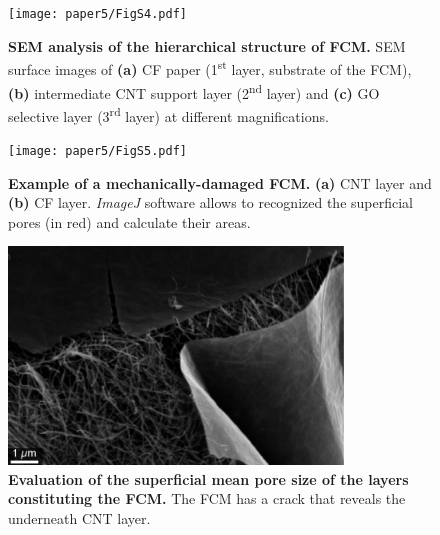 \begin{figure}
  \centering
  \texttt{[image: paper5/FigS4.pdf]}
  \caption{\textbf{SEM analysis of the hierarchical structure of FCM.} SEM surface images of \textbf{(a)} CF paper (1\textsuperscript{st} layer, substrate of the FCM), \textbf{(b)} intermediate CNT support layer (2\textsuperscript{nd} layer) and \textbf{(c)} GO selective layer (3\textsuperscript{rd} layer) at different magnifications.}
  \label{figS4_AppD}
\end{figure}

\begin{figure}
  \centering
  \texttt{[image: paper5/FigS5.pdf]}
  \caption{\textbf{Example of a mechanically-damaged FCM.} \textbf{(a)} CNT layer and \textbf{(b)} CF layer. \textit{ImageJ} software allows to recognized the superficial pores (in red) and calculate their areas.}
  \label{figS5_AppD}
\end{figure}



\begin{figure}
  \centering
  \includegraphics[width=3.5in]{paper5/FigS6.pdf}
  \caption{\textbf{Evaluation of the superficial mean pore size of the layers constituting the FCM.} The FCM has a crack that reveals the underneath CNT layer.}
  \label{figS6_AppD}
\end{figure}


